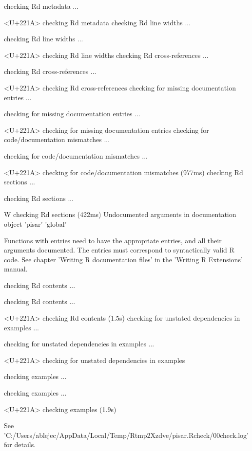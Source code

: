 \documentclass[a4paper,12pt]{article}\usepackage[]{graphicx}\usepackage[]{color}
\begin{document}
\begin{Schunk}
\begin{Soutput}
   checking Rd metadata ... 
  
<U+221A>  checking Rd metadata
   checking Rd line widths ...
  
   checking Rd line widths ... 
  
<U+221A>  checking Rd line widths
   checking Rd cross-references ...
  
   checking Rd cross-references ... 
  
<U+221A>  checking Rd cross-references
   checking for missing documentation entries ...
  
   checking for missing documentation entries ... 
  
<U+221A>  checking for missing documentation entries
   checking for code/documentation mismatches ...
  
   checking for code/documentation mismatches ... 
  
<U+221A>  checking for code/documentation mismatches (977ms)
   checking Rd \usage sections ...
  
   checking Rd \usage sections ... 
  
W  checking Rd \usage sections (422ms)
   Undocumented arguments in documentation object 'pisar'
     'global'
   

  
   Functions with \usage entries need to have the appropriate \alias
   entries, and all their arguments documented.
   The \usage entries must correspond to syntactically valid R code.
   See chapter 'Writing R documentation files' in the 'Writing R
   Extensions' manual.

  
  
  
   checking Rd contents ...
  
   checking Rd contents ... 
  
<U+221A>  checking Rd contents (1.5s)
   checking for unstated dependencies in examples ...
  
   checking for unstated dependencies in examples ... 
  
<U+221A>  checking for unstated dependencies in examples

  
  
  
   checking examples ...
  
   checking examples ... 
  
<U+221A>  checking examples (1.9s)

  
  
  
   

  
   See
     'C:/Users/ablejec/AppData/Local/Temp/Rtmp2Xzdve/pisar.Rcheck/00check.log'
   for details.
   

\end{Soutput}
\end{Schunk}
\end{document}
